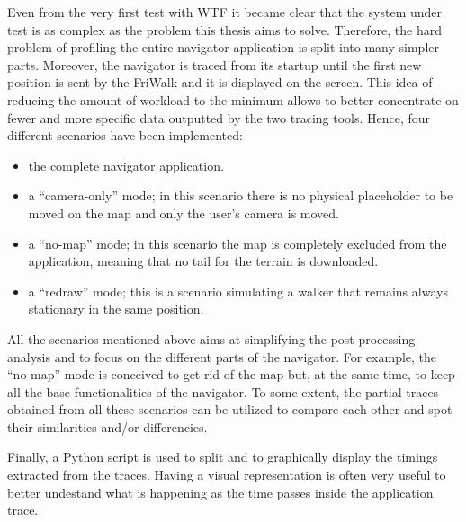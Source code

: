 Even from the very first test with WTF it became clear that the system under
test is as complex as the problem this thesis aims to solve. Therefore, the hard
problem of profiling the entire navigator application is split into many simpler
parts. Moreover, the navigator is traced from its startup until the first new
position is sent by the FriWalk and it is displayed on the screen. This idea of reducing the
amount of workload to the minimum allows to better concentrate on fewer and more
specific data outputted by the two tracing tools. Hence, four different scenarios
have been implemented:
\begin{itemize}
    \item the complete navigator application.
    \item a ``camera-only'' mode; in this scenario there is no physical placeholder
        to be moved on the map and only the user's camera is moved.
    \item a ``no-map'' mode; in this scenario the map is completely
        excluded from the application, meaning that no tail for the terrain is
        downloaded.
    \item a ``redraw'' mode; this is a scenario simulating a walker that remains
        always stationary in the same position.
\end{itemize}

All the scenarios mentioned above aims at simplifying the post-processing
analysis and to focus on the different parts of the navigator. For example, the
``no-map'' mode is conceived to get rid of the map but, at the same time, to keep
all the base functionalities of the navigator. To some extent, the partial traces
obtained from all these scenarios can be utilized to compare each other and spot
their similarities and/or differencies.

Finally, a Python script is used to split and to graphically display the
timings extracted from the traces. Having a visual representation is often very
useful to better undestand what is happening as the time passes inside the application
trace.
